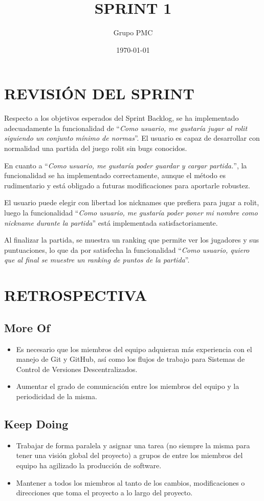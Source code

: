 \documentclass{article}
\title{SPRINT 1}
\date{\today}
\author{Grupo PMC}
\begin{document}
\maketitle
\section{REVISIÓN DEL SPRINT}
Respecto a los objetivos esperados del Sprint Backlog, se ha implementado adecuadamente la funcionalidad de ``\textit{Como usuario, me gustaría jugar al rolit siguiendo un conjunto mínimo de normas}''. El usuario es capaz de desarrollar con normalidad una partida del juego rolit sin bugs  conocidos.

En cuanto a ``\textit{Como usuario, me gustaría poder guardar y cargar partida.}'', la funcionalidad se ha implementado correctamente, aunque el método es rudimentario y está obligado a futuras modificaciones para aportarle robustez.

El usuario puede elegir con libertad los nicknames que prefiera para jugar a rolit, luego la funcionalidad ``\textit{Como usuario, me gustaría poder poner mi nombre como nickname durante la partida}'' está implementada satisfactoriamente.

Al finalizar la partida, se muestra un ranking que permite ver los jugadores y sus puntuaciones, lo que da por satisfecha la funcionalidad ``\textit{Como usuario, quiero que al final se muestre un ranking de puntos de la partida}''.



\section{RETROSPECTIVA}
\subsection{More Of}
\begin{itemize}
\item Es necesario que los miembros del equipo adquieran más experiencia con el manejo de Git y GitHub, así como los flujos de trabajo para Sistemas de Control de Versiones Descentralizados.

\item Aumentar el grado de comunicación entre los miembros del equipo y la periodicidad de la misma.

\end{itemize}
\subsection{Keep Doing}
\begin{itemize}
\item Trabajar de forma paralela y asignar una tarea (no siempre la misma para tener una visión global del proyecto) a grupos de entre los miembros del equipo ha agilizado la producción de software.

\item Mantener a todos los miembros al tanto de los cambios, modificaciones o direcciones que toma el proyecto a lo largo del proyecto.
\end{itemize}
\end{document}
